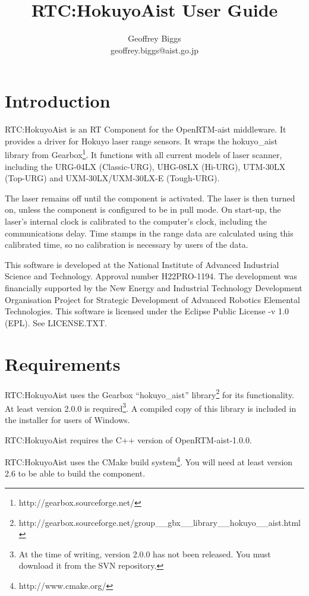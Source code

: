 \documentclass[a4paper,10pt]{article}
\title{RTC:HokuyoAist User Guide}
\author{Geoffrey Biggs\\
geoffrey.biggs@aist.go.jp}
\begin{document}
\maketitle

\section{Introduction}
\label{sec:intro}

RTC:HokuyoAist is an RT Component for the OpenRTM-aist middleware. It provides
a driver for Hokuyo laser range sensors. It wraps the hokuyo\_aist library from
Gearbox\footnote{http://gearbox.sourceforge.net/}. It functions with all
current models of laser scanner, including the URG-04LX (Classic-URG), UHG-08LX
(Hi-URG), UTM-30LX (Top-URG) and UXM-30LX/UXM-30LX-E (Tough-URG).

The laser remains off until the component is activated. The laser is then
turned on, unless the component is configured to be in pull mode. On start-up,
the laser's internal clock is calibrated to the computer's clock, including the
communications delay. Time stamps in the range data are calculated using this
calibrated time, so no calibration is necessary by users of the data.

This software is developed at the National Institute of Advanced Industrial
Science and Technology. Approval number H22PRO-1194. The development was
financially supported by the New Energy and Industrial Technology Development
Organisation Project for Strategic Development of Advanced Robotics Elemental
Technologies.  This software is licensed under the Eclipse Public License -v
1.0 (EPL). See LICENSE.TXT.

\section{Requirements}
\label{sec:requirements}

RTC:HokuyoAist uses the Gearbox ``hokuyo\_aist''
library\footnote{http://gearbox.sourceforge.net/group\_\_gbx\_\_library\_\_hokuyo\_\_aist.html}
for its functionality. At least version 2.0.0 is required\footnote{At the time
  of writing, version 2.0.0 has not been released. You must download it from
  the SVN repository.}. A compiled copy of this library is included in the
installer for users of Windows.

RTC:HokuyoAist requires the C++ version of OpenRTM-aist-1.0.0.

RTC:HokuyoAist uses the CMake build system\footnote{http://www.cmake.org/}. You
will need at least version 2.6 to be able to build the component.
\end{document}
